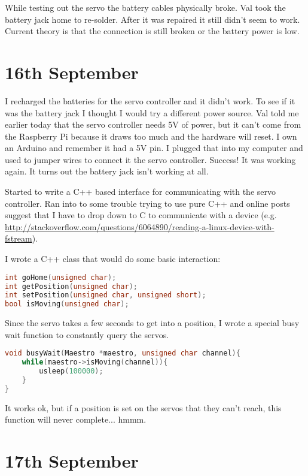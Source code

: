 While testing out the servo the battery cables physically broke. Val took the battery jack home to re-solder. After it was repaired it still didn't seem to work. Current theory is that the connection is still broken or the battery power is low.



\section*{16th September}


I recharged the batteries for the servo controller and it didn't work. To see if it was the battery jack I thought I would try a different power source. Val told me earlier today that the servo controller needs 5V of power, but it can't come from the Raspberry Pi because it draws too much and the hardware will reset. I own an Arduino and remember it had a 5V pin. I plugged that into my computer and used to jumper wires to connect it the servo controller. Success! It was working again. It turns out the battery jack isn't working at all.

Started to write a C++ based interface for communicating with the servo controller. Ran into to some trouble trying to use pure C++ and online posts suggest that I have to drop down to C to communicate with a device (e.g. \url{http://stackoverflow.com/questions/6064890/reading-a-linux-device-with-fstream}).

I wrote a C++ class that would do some basic interaction:

\begin{lstlisting}[language=C++]
int goHome(unsigned char);
int getPosition(unsigned char);
int setPosition(unsigned char, unsigned short);
bool isMoving(unsigned char);
\end{lstlisting}

Since the servo takes a few seconds to get into a position, I wrote a special busy wait function to constantly query the servos.

\begin{lstlisting}[language=C++]
void busyWait(Maestro *maestro, unsigned char channel){
    while(maestro->isMoving(channel)){
        usleep(100000);
    }
}
\end{lstlisting}

It works ok, but if a position is set on the servos that they can't reach, this function will never complete... hmmm.




\section*{17th September}

